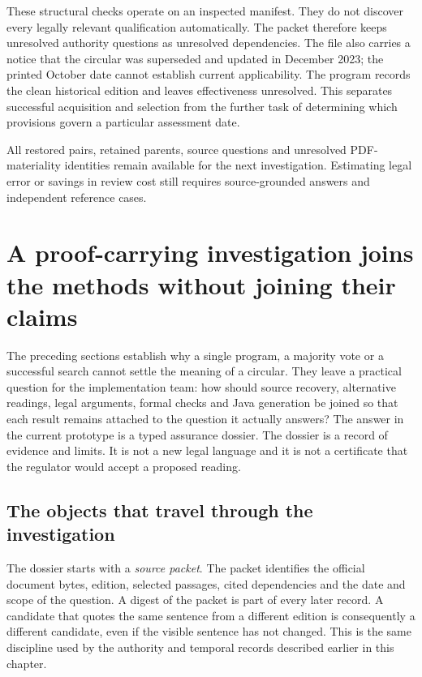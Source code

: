 \documentclass[12pt,a4paper,oneside,openany]{book}
\begin{document}
These structural checks operate on an inspected manifest. They do not discover
every legally relevant qualification automatically. The packet therefore keeps
unresolved authority questions as unresolved dependencies. The file also carries
a notice that the circular was superseded and updated in December 2023; the
printed October date cannot establish current applicability. The program
records the clean historical edition and leaves effectiveness unresolved. This
separates successful acquisition and selection from the further task of
determining which provisions govern a particular assessment date.

All restored pairs, retained parents, source questions and unresolved
PDF-materiality identities remain available for the next investigation.
Estimating legal error or savings in review cost still requires source-grounded
answers and independent reference cases.

\section{A proof-carrying investigation joins the methods without joining their claims}
\label{sec:proof-carrying-integration}

The preceding sections establish why a single program, a majority vote or a
successful search cannot settle the meaning of a circular. They leave a
practical question for the implementation team: how should source recovery,
alternative readings, legal arguments, formal checks and Java generation be
joined so that each result remains attached to the question it actually
answers? The answer in the current prototype is a typed assurance dossier.
The dossier is a record of evidence and limits. It is not a new legal language
and it is not a certificate that the regulator would accept a proposed reading.

\subsection{The objects that travel through the investigation}

The dossier starts with a \emph{source packet}. The packet identifies the
official document bytes, edition, selected passages, cited dependencies and
the date and scope of the question. A digest of the packet is part of every
later record. A candidate that quotes the same sentence from a different
edition is consequently a different candidate, even if the visible sentence
has not changed. This is the same discipline used by the authority and
temporal records described earlier in this chapter.
\end{document}
